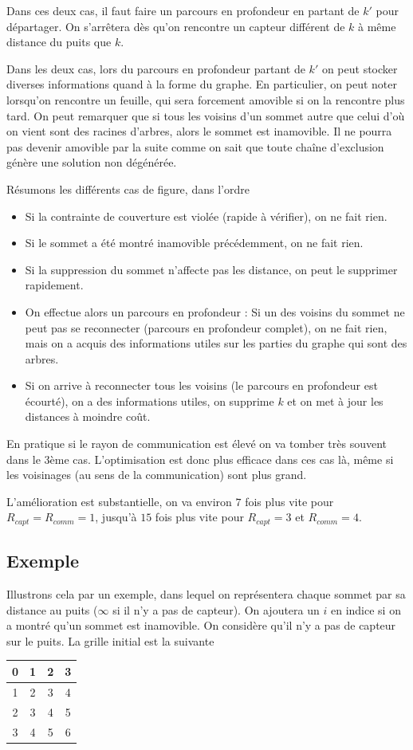 \documentclass[12pt,a4paper]{article}
\begin{document}
Dans ces deux cas, il faut faire un parcours en profondeur en partant de $k'$ pour départager. On s'arrêtera dès qu'on rencontre un capteur différent de $k$ à même distance du puits que $k$. 

Dans les deux cas, lors du parcours en profondeur partant de $k'$ on peut stocker diverses informations quand à la forme du graphe. En particulier, on peut noter lorsqu'on rencontre un feuille, qui sera forcement amovible si on la rencontre plus tard. On peut remarquer que si tous les voisins d'un sommet autre que celui d'où on vient sont des racines d'arbres, alors le sommet est inamovible. Il ne pourra pas devenir amovible par la suite comme on sait que toute chaîne d'exclusion génère une solution non dégénérée.

Résumons les différents cas de figure, dans l'ordre
\begin{itemize}
\item Si la contrainte de couverture est violée (rapide à vérifier), on ne fait rien.
\item Si le sommet a été montré inamovible précédemment, on ne fait rien.
\item Si la suppression du sommet n'affecte pas les distance, on peut le supprimer rapidement.
\item On effectue alors un parcours en profondeur : Si un des voisins du sommet ne peut pas se reconnecter (parcours en profondeur complet), on ne fait rien, mais on a acquis des informations utiles sur les parties du graphe qui sont des arbres.
\item Si on arrive à reconnecter tous les voisins (le parcours en profondeur est écourté), on a des informations utiles, on supprime $k$ et on met à jour les distances à moindre coût. 
\end{itemize}

En pratique si le rayon de communication est élevé on va tomber très souvent dans le 3ème cas. L'optimisation est donc plus efficace dans ces cas là, même si les voisinages (au sens de la communication) sont plus grand.

L'amélioration est substantielle, on va environ $7$ fois plus vite pour $R_{capt}=R_{comm}=1$, jusqu'à $15$ fois plus vite pour $R_{capt}= 3$ et $R_{comm}=4$.
\subsection{Exemple}
Illustrons cela par un exemple, dans lequel on représentera chaque sommet par sa distance au puits ($\infty$ si il n'y a pas de capteur). On ajoutera un $i$ en indice si on a montré qu'un sommet est inamovible.
On considère qu'il n'y a pas de capteur sur le puits. La grille initial est la suivante
\begin{center}
\begin{tabular}{|c|c|c|c|}
\hline 
0 & 1 & 2 & 3 \\ 
\hline 
1 & 2 & 3 & 4 \\ 
\hline 
2 & 3 & 4 & 5 \\ 
\hline 
3 & 4 & 5 & 6 \\ 
\hline 
\end{tabular}
\end{center}
\end{document}
